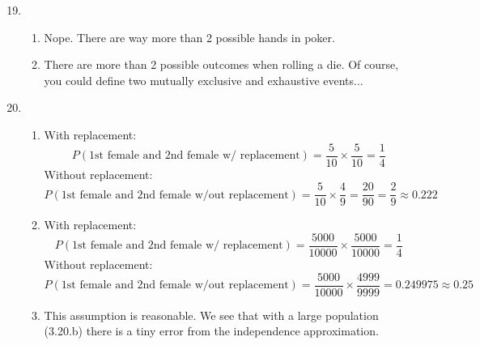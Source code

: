 \documentclass[12pt,letterpaper]{article}
\begin{document}
\newcommand{\N}[2]{\mathcal{N}\big(#1,~#2\big)}
\newcommand{\Geo}[1]{\texttt{Geo}\big(#1\big)}
\newcommand{\AND}{\textsc{~and~}}
\newcommand{\OR}{\textsc{~or~}}

\begin{enumerate}
\setcounter{enumi}{18}
\item \begin{enumerate}
\item Nope. There are way more than 2 possible hands in poker. 
\item There are more than 2 possible outcomes when rolling a die. Of course, you could define two mutually exclusive and exhaustive events...
\end{enumerate}

\item \begin{enumerate}
\item With replacement:
$$P(\text{1st female and 2nd female w/ replacement})=\frac{5}{10} \times \frac{5}{10} = \frac{1}{4} $$
Without replacement:
$$P(\text{1st female and 2nd female w/out replacement})=\frac{5}{10} \times \frac{4}{9} = \frac{20}{90} = \frac{2}{9} \approx 0.222 $$
\item With replacement:
$$P(\text{1st female and 2nd female w/ replacement})=\frac{5000}{10000} \times \frac{5000}{10000} = \frac{1}{4} $$
Without replacement:
$$P(\text{1st female and 2nd female w/out replacement})=\frac{5000}{10000} \times \frac{4999}{9999} = 0.249975 \approx 0.25 $$
\item This assumption is reasonable. We see that with a large population (3.20.b) there is a tiny error from the independence approximation.
\end{enumerate}


\end{enumerate}
\end{document}
